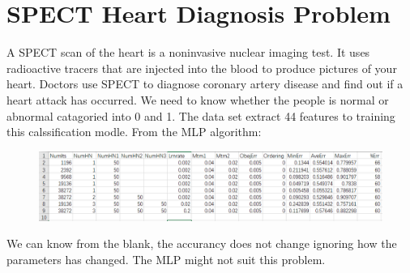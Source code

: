\documentclass[runningheads]{llncs}
\begin{document}
\section{ SPECT Heart Diagnosis Problem }
A SPECT scan of the heart is a noninvasive nuclear imaging test.
It uses radioactive tracers that are injected into the blood to
produce pictures of your heart. Doctors use SPECT to diagnose 
coronary artery disease and find out if a heart attack has 
occurred. We need to know whether the people is normal or abnormal
catagoried into 0 and 1. The data set extract 44 features to training
this calssification modle. From the MLP algorithm:
\begin{figure}[H]
    \centering
    \includegraphics[scale=0.7]{data3.PNG}  
\end{figure}
We can know from the blank, the accurancy does not change
ignoring how the parameters has changed. The MLP might not
suit this problem.
\end{document}
